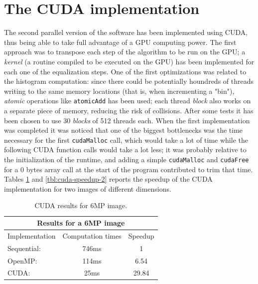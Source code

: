 \documentclass[10pt,twocolumn,letterpaper]{article}
\begin{document}
\section{The CUDA implementation}

The second parallel version of the software has been implemented using CUDA, thus being
able to take full advantage of a GPU computing power. The first approach was to transpose
each step of the algorithm to be run on the GPU; a \emph{kernel} (a routine compiled to be
executed on the GPU) has been implemented for each one of the equalization steps.
One of the first optimizations was related to the histogram computation: since there could
be potentially houndreds of threads writing to the same memory locations (that is, when
incrementing a "bin"), \emph{atomic} operations like \verb|atomicAdd| has been used; each
thread \emph{block} also works on a separate piece of memory, reducing the risk of collisions.
After some tests it has been chosen to use 30 \emph{blocks} of 512 threads each.
When the first implementation was completed it was noticed that one of the biggest bottlenecks
was the time necessary for the first \verb|cudaMalloc| call, which would take a lot of time
while the following CUDA function calls would take a lot less; it was probably relative to
the initialization of the runtime, and adding a simple \verb|cudaMalloc| and \verb|cudaFree|
for a 0 bytes array call at the start of the program contributed to trim that time.
Tables \ref{tbl:cuda-speedup-1} and \ref{tbl:cuda-speedup-2} reports the speedup of the
CUDA implementation for two images of different dimensions.

\begin{table}
    \begin{center}
    \begin{tabular}{|l|c|c|}
    \hline
    \multicolumn{3}{|c|}{Results for a 6MP image} \\
    \hline
    Implementation & Computation times & Speedup \\
    \hline
    Sequential: & 746ms & 1 \\
    OpenMP: & 114ms & 6.54 \\
    CUDA: & 25ms & 29.84 \\
    \hline
    \end{tabular}
    \end{center}
    \caption{CUDA results for 6MP image.}
    \label{tbl:cuda-speedup-1}
\end{table}
\end{document}
